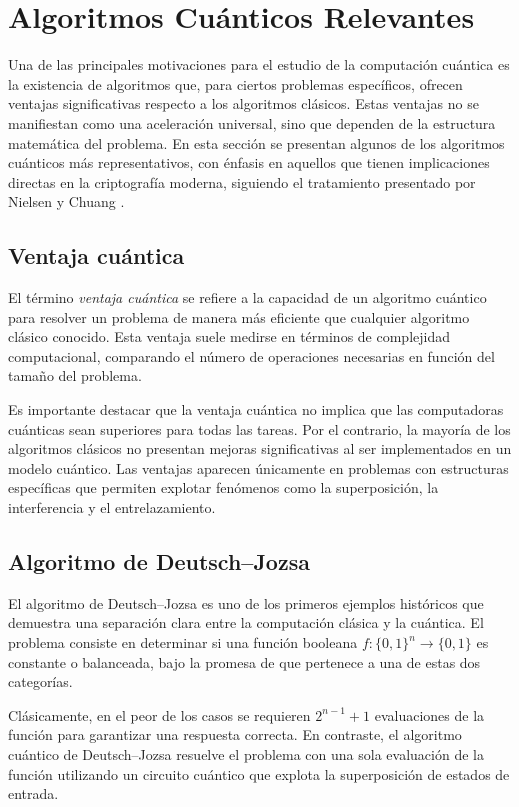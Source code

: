 \documentclass[12pt]{article}
\begin{document}
\section{Algoritmos Cuánticos Relevantes}

Una de las principales motivaciones para el estudio de la computación cuántica es la existencia de algoritmos que, para ciertos problemas específicos, ofrecen ventajas significativas respecto a los algoritmos clásicos. Estas ventajas no se manifiestan como una aceleración universal, sino que dependen de la estructura matemática del problema. En esta sección se presentan algunos de los algoritmos cuánticos más representativos, con énfasis en aquellos que tienen implicaciones directas en la criptografía moderna, siguiendo el tratamiento presentado por Nielsen y Chuang \cite{nielsen}.

\subsection{Ventaja cuántica}

El término \textit{ventaja cuántica} se refiere a la capacidad de un algoritmo cuántico para resolver un problema de manera más eficiente que cualquier algoritmo clásico conocido. Esta ventaja suele medirse en términos de complejidad computacional, comparando el número de operaciones necesarias en función del tamaño del problema.

Es importante destacar que la ventaja cuántica no implica que las computadoras cuánticas sean superiores para todas las tareas. Por el contrario, la mayoría de los algoritmos clásicos no presentan mejoras significativas al ser implementados en un modelo cuántico. Las ventajas aparecen únicamente en problemas con estructuras específicas que permiten explotar fenómenos como la superposición, la interferencia y el entrelazamiento.

\subsection{Algoritmo de Deutsch--Jozsa}

El algoritmo de Deutsch--Jozsa es uno de los primeros ejemplos históricos que demuestra una separación clara entre la computación clásica y la cuántica. El problema consiste en determinar si una función booleana $f:\{0,1\}^n \rightarrow \{0,1\}$ es constante o balanceada, bajo la promesa de que pertenece a una de estas dos categorías.

Clásicamente, en el peor de los casos se requieren $2^{n-1} + 1$ evaluaciones de la función para garantizar una respuesta correcta. En contraste, el algoritmo cuántico de Deutsch--Jozsa resuelve el problema con una sola evaluación de la función utilizando un circuito cuántico que explota la superposición de estados de entrada.
\end{document}
